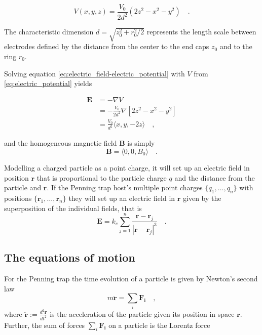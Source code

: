 \documentclass[../main_proj3.tex]{subfiles}
\begin{document}
\begin{equation}
\label{eq:electric_potential}
V(x,y,z) = \frac{V_0}{2d^{2}} (2z^{2} - x^{2} - y^{2}) \quad.
\end{equation}

The characteristic dimension $d=\sqrt{z_0^{2}+r_0^{2}/2}$ represents the length scale between electrodes defined by the distance from the center to the end caps $z_0$ and to the ring $r_0$. 

Solving equation \eqref{eq:electric_field-electric_potential} with $V$ from \eqref{eq:electric_potential} yields

\begin{equation}
\label{eq:solved_electric_field}
\begin{split}
\mathbf{E} & = - \nabla V \quad \\
& = - \frac{V_0}{2d^{2}} \nabla \left[2z^{2}-x^{2}-y^{2}\right] \\
& = \frac{V_0}{d^{2}} 
\bigl\langle 
x, y, -2z
\bigr\rangle \quad ,
\end{split}
\end{equation}

and the homogeneous magnetic field $\mathbf{B}$ is simply 
\begin{equation}
\label{eq:magnetic_field}
\mathbf{B} = \bigl\langle 
0, 0, B_0
\bigr\rangle \quad.
\end{equation}

 Modelling a charged particle as a point charge, it will set up an electric field in position $\mathbf{r}$ that is proportional to the particle charge $q$ and the distance from the particle and $\mathbf{r}$. If the Penning trap host's multiple point charges $\{q_1, \dots, q_n\}$ with positions $\{\mathbf{r}_1, \dots, \mathbf{r}_n\}$ they will set up an electric field in $\mathbf{r}$ given by the superposition of the individual fields, that is
\begin{equation}
\label{eq:electric_field_particles}
\mathbf{E} = k_e \sum\limits_{j=1}^n \frac{\mathbf{r}-\mathbf{r}_j}{|\mathbf{r}-\mathbf{r}_j|^{3}} \quad.
\end{equation}


\subsection{The equations of motion}

For the Penning trap the time evolution of a particle is given by Newton's second law 
\begin{equation}
\label{eq:newtons_second_law_Penning_trap}
m \mathbf{\ddot{r}}  = \sum_i \mathbf{F_i} \quad ,
\end{equation}
where $\mathbf{\ddot{r}}:=\frac{d^{2}\mathbf{r}}{dt^{2}}$ is the acceleration of the particle given its position in space $\mathbf{r}$. Further, the sum of forces $\sum_i \mathbf{F_i}$ on a particle is the Lorentz force
\end{document}
